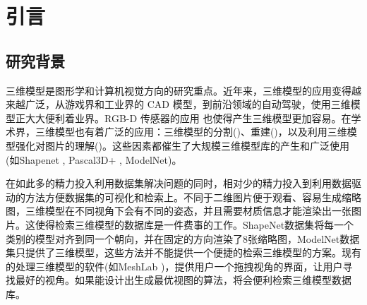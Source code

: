 \documentclass[UTF8,openany,AutoFakeBold,AutoFakeSlant,cs4size]{ctexbook}
\begin{document}
{
	\fancyhf{}
	\fancyfoot[CO,CE]{~\thepage~}
	\renewcommand{\headrulewidth}{0.7pt}
	\renewcommand{\footrulewidth}{0pt}
}
\fancyhf{}
\fancyfoot[CO,CE]{~\thepage~}
\renewcommand{\headrulewidth}{0.7pt}
\renewcommand{\footrulewidth}{0pt}
\renewcommand{\contentsname}{\centerline{全文目录}}
\tableofcontents
{}
\clearpage





\normalsize
\linespread{1.5}\selectfont
{
	\fancyhf{}
	\fancyhead[RE,RO]{\leftmark}
	\fancyfoot[CO,CE]{~\thepage~}
	\renewcommand{\headrulewidth}{0.7pt}
	\renewcommand{\footrulewidth}{0pt}
}
\fancyhf{}
\fancyhead[RE,RO]{\leftmark}
\fancyfoot[CO,CE]{~\thepage~}
\renewcommand{\headrulewidth}{0.7pt}
\renewcommand{\footrulewidth}{0pt}



\chapter{引言}

\section{研究背景}

三维模型是图形学和计算机视觉方向的研究重点。近年来，三维模型的应用变得越来越广泛，从游戏界和工业界的 CAD 模型，到前沿领域的自动驾驶，使用三维模型正大大便利着业界。RGB-D 传感器的应用
也使得产生三维模型更加容易。在学术界，三维模型也有着广泛的应用：三维模型的分割(\cite{Chen2009ABF, Kundu2014JointSS})、重建(\cite{Choy20163DR2N2AU, Mandikal20183DLMNetLE})，以及利用三维模型强化对图片的理解(\cite{Choy2015EnrichingOD})。这些因素都催生了大规模三维模型库的产生和广泛使用(如Shapenet \cite{Chang2015ShapeNetAI}, Pascal3D+ \cite{Xiang2014BeyondPA}, ModelNet\cite{Wu20143DSA})。

在如此多的精力投入利用数据集解决问题的同时，相对少的精力投入到利用数据驱动的方法方便数据集的可视化和检索上。不同于二维图片便于观看、容易生成缩略图，三维模型在不同视角下会有不同的姿态，并且需要材质信息才能渲染出一张图片。这使得检索三维模型的数据库是一件费事的工作。ShapeNet数据集\cite{Chang2015ShapeNetAI}将每一个类别的模型对齐到同一个朝向，并在固定的方向渲染了8张缩略图，ModelNet数据集\cite{Wu20143DSA}只提供了三维模型，这些方法并不能提供一个便捷的检索三维模型的方案。现有的处理三维模型的软件(如MeshLab \cite{Cignoni2008MeshLabAO})，提供用户一个拖拽视角的界面，让用户寻找最好的视角。如果能设计出生成最优视图的算法，将会便利检索三维模型数据库。
\end{document}
